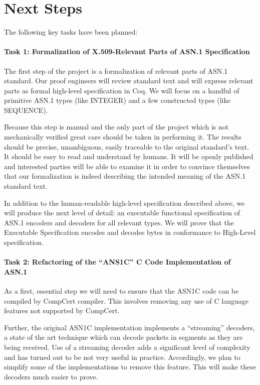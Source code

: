 \documentclass[acmsmall,nonacm]{acmart}
\begin{document}
 \section{Next Steps}
The following key tasks have been planned:
 
\paragraph{Task 1: Formalization of X.509-Relevant Parts of ASN.1 Specification}
The first step of the project is a formalization of relevant parts of ASN.1 standard. Our proof engineers will review standard text and will express relevant parts as formal high-level specification in Coq. We will focus on a handful of primitive ASN.1 types (like INTEGER) and a few constructed types (like SEQUENCE).

Because this step is manual and the only part of the project which is not mechanically verified great care should be taken in performing it. The results should be precise, unambiguous, easily traceable to the original standard's text. It should be easy to read and understand by humans. It will be openly published and interested parties will be able to examine it in order to convince themselves that our formalization is indeed describing the intended meaning of the ASN.1 standard text.

In addition to the human-readable high-level specification described above, we will produce the next level of detail: an executable functional specification of ASN.1 encoders and decoders for all relevant types. We will prove that the Executable Specification encodes and decodes bytes in conformance to High-Level specification.

\paragraph{Task 2: Refactoring of the ``ANS1C'' C Code Implementation of ASN.1}

As a first, essential step we will need to ensure that the ASN1C code can be compiled by CompCert compiler. This involves removing any use of C language features not supported by CompCert.

Further, the original ASN1C implementation implements a ``streaming'' decoders, a state of the art technique which can decode packets in segments as they are being received. Use of a streaming decoder adds a significant level of complexity and has turned out to be not very useful in practice. Accordingly, we plan to simplify some of the implementations to remove this feature. This will make these decoders much easier to prove.
\end{document}
